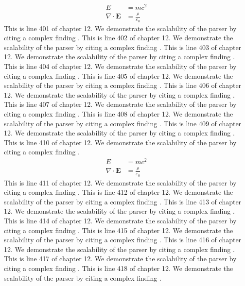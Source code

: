 \begin{align*}
  E &= mc^2 \\
  \nabla \cdot \mathbf{E} &= \frac{\rho}{\varepsilon_0}
\end{align*}
This is line 401 of chapter 12. We demonstrate the scalability of the parser by citing a complex finding \cite{ref12_401}.
This is line 402 of chapter 12. We demonstrate the scalability of the parser by citing a complex finding \cite{ref12_402}.
This is line 403 of chapter 12. We demonstrate the scalability of the parser by citing a complex finding \cite{ref12_403}.
This is line 404 of chapter 12. We demonstrate the scalability of the parser by citing a complex finding \cite{ref12_404}.
This is line 405 of chapter 12. We demonstrate the scalability of the parser by citing a complex finding \cite{ref12_405}.
This is line 406 of chapter 12. We demonstrate the scalability of the parser by citing a complex finding \cite{ref12_406}.
This is line 407 of chapter 12. We demonstrate the scalability of the parser by citing a complex finding \cite{ref12_407}.
This is line 408 of chapter 12. We demonstrate the scalability of the parser by citing a complex finding \cite{ref12_408}.
This is line 409 of chapter 12. We demonstrate the scalability of the parser by citing a complex finding \cite{ref12_409}.
This is line 410 of chapter 12. We demonstrate the scalability of the parser by citing a complex finding \cite{ref12_410}.
\begin{align*}
  E &= mc^2 \\
  \nabla \cdot \mathbf{E} &= \frac{\rho}{\varepsilon_0}
\end{align*}
This is line 411 of chapter 12. We demonstrate the scalability of the parser by citing a complex finding \cite{ref12_411}.
This is line 412 of chapter 12. We demonstrate the scalability of the parser by citing a complex finding \cite{ref12_412}.
This is line 413 of chapter 12. We demonstrate the scalability of the parser by citing a complex finding \cite{ref12_413}.
This is line 414 of chapter 12. We demonstrate the scalability of the parser by citing a complex finding \cite{ref12_414}.
This is line 415 of chapter 12. We demonstrate the scalability of the parser by citing a complex finding \cite{ref12_415}.
This is line 416 of chapter 12. We demonstrate the scalability of the parser by citing a complex finding \cite{ref12_416}.
This is line 417 of chapter 12. We demonstrate the scalability of the parser by citing a complex finding \cite{ref12_417}.
This is line 418 of chapter 12. We demonstrate the scalability of the parser by citing a complex finding \cite{ref12_418}.
